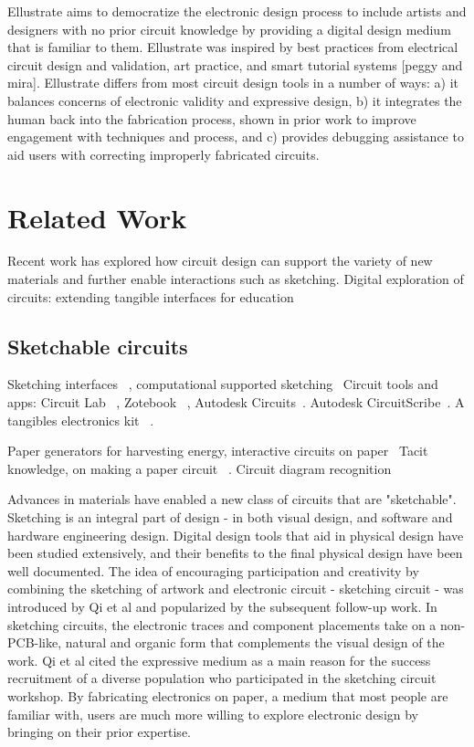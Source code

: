 \documentclass{sigchi}
\begin{document}
Ellustrate aims to democratize the electronic design process to include artists and designers with no prior circuit knowledge by providing a digital design medium that is familiar to them.  
Ellustrate was inspired by best practices from electrical circuit design and validation, art practice, and smart tutorial systems [peggy and mira]. Ellustrate differs from most circuit design tools in a number of ways: a) it balances concerns of electronic validity and expressive design, b) it integrates the human back into the fabrication process, shown in prior work to improve engagement with techniques and process, and c) provides debugging assistance to aid users with correcting improperly fabricated circuits. 





\section{Related Work}


Recent work has explored how circuit design can support the variety of new materials and further enable interactions such as sketching. 
Digital exploration of circuits: extending tangible interfaces for education 

\subsection{Sketchable circuits}

Sketching interfaces ~\cite{jorge_sketch-based_2011}, computational supported sketching~\cite{johnson_computational_2009} 
Circuit tools and apps: Circuit Lab~\cite{_circuitlab_????} , Zotebook ~\cite{_zotebook_????}, Autodesk Circuits~\cite{_autodesk123d_????}. Autodesk CircuitScribe~\cite{_autodesk_????}. 
A tangibles electronics kit ~\cite{baafi_toolkit_2011}. 

Paper generators for harvesting energy, interactive circuits on paper~\cite{karagozler_paper_2013} 
Tacit knowledge, on making a paper circuit ~\cite{shorter_practical_2014}.
Circuit diagram recognition~\cite{feng_-line_2009} 

Advances in materials have enabled a new class of circuits that are "sketchable". Sketching is an integral part of design - in both visual design, and software and hardware engineering design. Digital design tools that aid in physical design have been studied extensively, and their benefits to the final physical design have been well documented. The idea of encouraging participation and creativity by combining the sketching of artwork and electronic circuit - sketching circuit - was introduced by Qi et al and popularized by the subsequent follow-up work. In sketching circuits, the electronic traces and component placements take on a non-PCB-like, natural and organic form that complements the visual design of the work. Qi et al cited the expressive medium as a main reason for the success recruitment of a diverse population who participated in the sketching circuit workshop. By fabricating electronics on paper, a medium that most people are familiar with, users are much more willing to explore electronic design by bringing on their prior expertise.  
\end{document}

